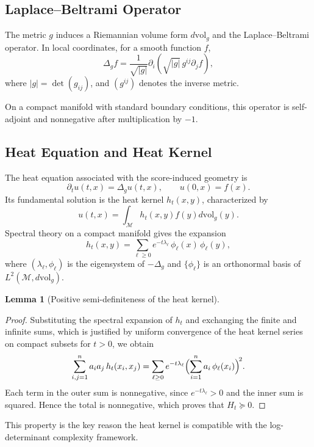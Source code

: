 \documentclass{article}
\newcommand{\M}{\mathcal{M}}
\newtheorem{lemma}{Lemma}%
\begin{document}
\subsection{Laplace--Beltrami Operator}

The metric \(g\) induces a Riemannian volume form \(d\mathrm{vol}_g\) and the Laplace--Beltrami operator. In local coordinates, for a smooth function \(f\),
\[
\Delta_g f
=
\frac{1}{\sqrt{|g|}}
\partial_i\!\left(\sqrt{|g|}\,g^{ij}\partial_j f\right),
\]
where \(|g|=\det(g_{ij})\), and \((g^{ij})\) denotes the inverse metric.

On a compact manifold with standard boundary conditions, this operator is self-adjoint and nonnegative after multiplication by \(-1\).

\subsection{Heat Equation and Heat Kernel}

The heat equation associated with the score-induced geometry is
\[
\partial_t u(t,x)=\Delta_g u(t,x),
\qquad
u(0,x)=f(x).
\]
Its fundamental solution is the heat kernel \(h_t(x,y)\), characterized by
\[
u(t,x)=\int_{\M} h_t(x,y)f(y)d\mathrm{vol}_g(y).
\]
Spectral theory on a compact manifold gives the expansion
\[
h_t(x,y)=\sum_{\ell\geq 0} e^{-t\lambda_\ell}\,\phi_\ell(x)\,\phi_\ell(y),
\]
where \((\lambda_\ell,\phi_\ell)\) is the eigensystem of \(-\Delta_g\) and \(\{\phi_\ell\}\) is an orthonormal basis of \(L^2(\M,d\mathrm{vol}_g)\).

\begin{lemma}[Positive semi-definiteness of the heat kernel]\label{lem:heat-psd}
\end{lemma}

\begin{proof}
Substituting the spectral expansion of \(h_t\) and exchanging the finite and infinite sums, which is justified by uniform convergence of the heat kernel series on compact subsets for \(t>0\), we obtain
\[
\sum_{i,j=1}^{n}a_i a_j\, h_t(x_i,x_j)
=
\sum_{\ell\geq 0}e^{-t\lambda_\ell}
\Bigl(\sum_{i=1}^{n}a_i\,\phi_\ell(x_i)\Bigr)^{\!2}.
\]
Each term in the outer sum is nonnegative, since \(e^{-t\lambda_\ell}>0\) and the inner sum is squared. Hence the total is nonnegative, which proves that \(H_t\succeq 0\).
\end{proof}

This property is the key reason the heat kernel is compatible with the log-determinant complexity framework.
\end{document}
